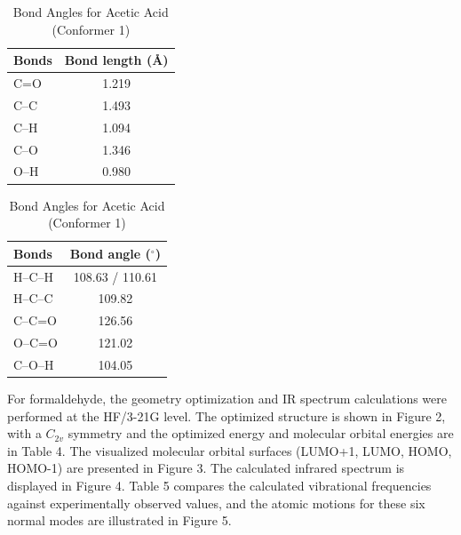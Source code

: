 \documentclass[12pt]{article}
\begin{document}
\begin{table}[htbp]
    \centering
    \begin{minipage}[t]{0.48\textwidth}
        \centering
        \caption{Bond Lengths for Acetic Acid (Conformer 1)}
        \vspace{0.5em}
        \begin{tabular}{lc}
            \toprule
            \textbf{Bonds} & \textbf{Bond length (\AA)} \\
            \midrule
            C=O  & 1.219 \\
            C--C & 1.493 \\
            C--H & 1.094 \\
            C--O & 1.346 \\
            O--H & 0.980 \\
            \bottomrule
        \end{tabular}
        \label{tab:bond_lengths}
    \end{minipage}%
    \hfill 
    \begin{minipage}[t]{0.48\textwidth}
        \centering
        \caption{Bond Angles for Acetic Acid (Conformer 1)}
        \vspace{0.5em}
        \begin{tabular}{lc}
            \toprule
            \textbf{Bonds} & \textbf{Bond angle ($^\circ$)} \\
            \midrule
            H--C--H & 108.63 / 110.61 \\
            H--C--C & 109.82 \\
            C--C=O  & 126.56 \\
            O--C=O  & 121.02 \\
            C--O--H & 104.05 \\
            \bottomrule
        \end{tabular}
        \label{tab:bond_angles}
    \end{minipage}
\end{table}

\noindent
For formaldehyde, the geometry optimization and IR spectrum calculations were performed at the HF/3-21G level. The optimized structure is shown in Figure 2, with a $C_{2v}$ symmetry and the optimized energy and molecular orbital energies are in Table 4. The visualized molecular orbital surfaces (LUMO+1, LUMO, HOMO, HOMO-1) are presented in Figure 3. The calculated infrared spectrum is displayed in Figure 4. Table 5 compares the calculated vibrational frequencies against experimentally observed values, and the atomic motions for these six normal modes are illustrated in Figure 5.
\end{document}
